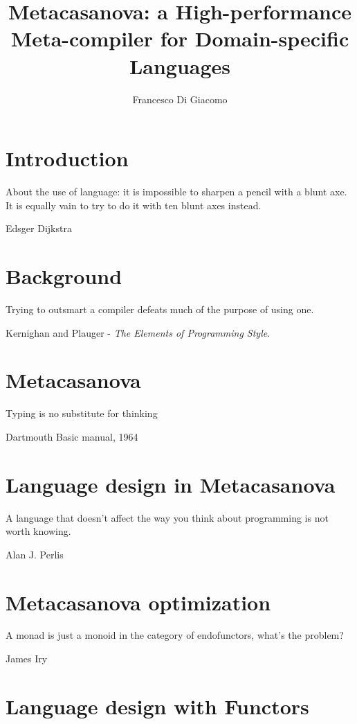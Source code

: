 \documentclass[8pt,a5paper,openright]{extbook}
\author{Francesco Di Giacomo}
\title{Metacasanova: a High-performance Meta-compiler for Domain-specific Languages}
\date { }
\theoremstyle{definition}
\begin{document}
\cleardoublepage
\thispagestyle{empty}
\frontmatter
{} %
\maketitle

\newpage
\tableofcontents

\mainmatter
{}
\chapter{Introduction}
\label{ch:introduction}
\epigraph{About the use of language: it is impossible to sharpen a pencil with a blunt axe. It is equally vain to try to do it with ten blunt axes instead.}{Edsger Dijkstra}

	

\chapter{Background}
\label{ch:background}
\epigraph{Trying to outsmart a compiler defeats much of the purpose of using one.}{Kernighan and Plauger - \textit{The Elements of Programming Style}.}

	
\chapter{Metacasanova}
\label{ch:metacasanova}
\epigraph{Typing is no substitute for thinking}{Dartmouth Basic manual, 1964}
		

\chapter{Language design in Metacasanova}
\label{ch:languages}
\epigraph{A language that doesn't affect the way you think about programming is not worth knowing.}{Alan J. Perlis}


\chapter{Metacasanova optimization}
\label{ch:functors}
\epigraph{A monad is just a monoid in the category of endofunctors, what's the problem?}{James Iry}

	
\chapter{Language design with Functors}
\label{ch:networking}

\end{document}
